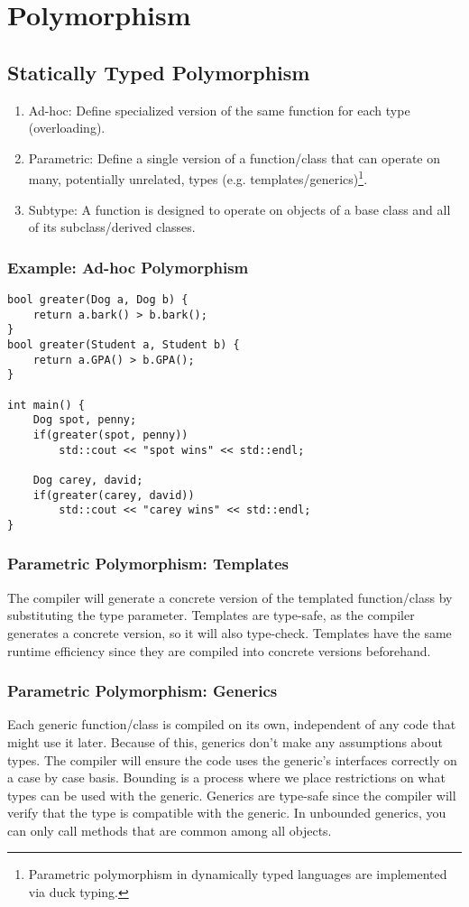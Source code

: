 \documentclass{article}
\begin{document}
\section{Polymorphism}
\subsection{Statically Typed Polymorphism}
\begin{enumerate}[label=(\roman*)]
\item Ad-hoc: Define specialized version of the same function for each
  type (overloading).
\item Parametric: Define a single version of a function/class that can
  operate on many, potentially unrelated, types
  (e.g. templates/generics)\footnote{Parametric polymorphism in
    dynamically typed languages are implemented via duck typing.}.
\item Subtype: A function is designed to operate on objects of a base
  class and all of its subclass/derived classes.
\end{enumerate}

\subsubsection*{Example: Ad-hoc Polymorphism}
\begin{verbatim}
bool greater(Dog a, Dog b) {
    return a.bark() > b.bark();
}
bool greater(Student a, Student b) {
    return a.GPA() > b.GPA();
}

int main() {
    Dog spot, penny;
    if(greater(spot, penny))
        std::cout << "spot wins" << std::endl;

    Dog carey, david;
    if(greater(carey, david))
        std::cout << "carey wins" << std::endl;
}
\end{verbatim}

\subsubsection{Parametric Polymorphism: Templates}
The compiler will generate a concrete version of the templated
function/class by substituting the type parameter. Templates are
type-safe, as the compiler generates a concrete version, so it will
also type-check. Templates have the same runtime efficiency since they
are compiled into concrete versions beforehand.

\subsubsection{Parametric Polymorphism: Generics}
Each generic function/class is compiled on its own, independent of any
code that might use it later. Because of this, generics don't make any
assumptions about types. The compiler will ensure the code uses the
generic's interfaces correctly on a case by case basis. Bounding is a
process where we place restrictions on what types can be used with the
generic. Generics are type-safe since the compiler will verify that
the type is compatible with the generic. In unbounded generics, you
can only call methods that are common among all objects.
\end{document}
